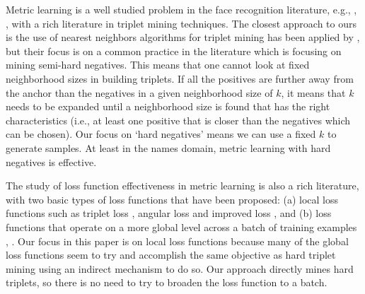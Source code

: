 Metric learning is a well studied problem in the face recognition literature, e.g., \cite{DBLP:conf/cvpr/2014}, \cite{DBLP:conf/cvpr/SchroffKP15}, with a rich literature in triplet mining techniques.  The closest approach to ours is the use of nearest neighbors algorithms for triplet mining has been applied by \cite{DBLP:journals/corr/KumarHC0D17}, but their focus is on a common practice in the literature which is focusing on mining semi-hard negatives.  This means that one cannot look at fixed neighborhood sizes in building triplets.  If all the positives are further away from the anchor than the negatives in a given neighborhood size of $k$, it means that $k$ needs to be expanded until a neighborhood size is found that has the right characteristics (i.e., at least one positive that is closer than the negatives which can be chosen).  Our focus on `hard negatives' means we can use a fixed $k$ to generate samples.  At least in the names domain, metric learning with hard negatives is effective.

The study of loss function effectiveness in metric learning is also a rich literature, with two basic types of loss functions that have been proposed: (a) local loss functions such as triplet loss \cite{DBLP:conf/cvpr/SchroffKP15}, angular loss \cite{Zhang:2016:DML:3088616.3088665} and improved loss \cite{DBLP:journals/corr/abs-1708-01682}, and (b) loss functions that operate on a more global level across a batch of training examples \cite{NIPS2016_6200}, \cite{songCVPR17}.  Our focus in this paper is on local loss functions because many of the global loss functions seem to try and accomplish the same objective as hard triplet mining \cite{songCVPR17} using an indirect mechanism to do so.  Our approach directly mines hard triplets, so there is no need to try to broaden the loss function to a batch.
